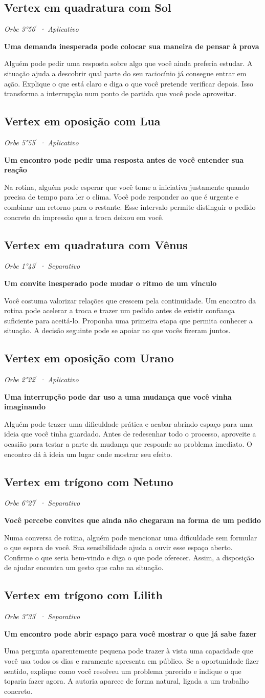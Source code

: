 \documentclass[11pt,a4paper]{article}
\newcommand{\leitura}[3]{\subsection{#1}\textit{#2}\par #3}
\newcommand{\subtituloleitura}[1]{\textbf{#1}\par\nopagebreak[4]}
\begin{document}
\leitura{Vertex em quadratura com Sol}{Orbe 3°56\ensuremath{^{\prime}} · Aplicativo}{
\subtituloleitura{Uma demanda inesperada pode colocar sua maneira de pensar à prova}
Alguém pode pedir uma resposta sobre algo que você ainda preferia estudar. A situação ajuda a descobrir qual parte do seu raciocínio já consegue entrar em ação. Explique o que está claro e diga o que você pretende verificar depois. Isso transforma a interrupção num ponto de partida que você pode aproveitar.
}

\leitura{Vertex em oposição com Lua}{Orbe 5°55\ensuremath{^{\prime}} · Aplicativo}{
\subtituloleitura{Um encontro pode pedir uma resposta antes de você entender sua reação}
Na rotina, alguém pode esperar que você tome a iniciativa justamente quando precisa de tempo para ler o clima. Você pode responder ao que é urgente e combinar um retorno para o restante. Esse intervalo permite distinguir o pedido concreto da impressão que a troca deixou em você.
}

\leitura{Vertex em quadratura com Vênus}{Orbe 1°43\ensuremath{^{\prime}} · Separativo}{
\subtituloleitura{Um convite inesperado pode mudar o ritmo de um vínculo}
Você costuma valorizar relações que crescem pela continuidade. Um encontro da rotina pode acelerar a troca e trazer um pedido antes de existir confiança suficiente para aceitá-lo. Proponha uma primeira etapa que permita conhecer a situação. A decisão seguinte pode se apoiar no que vocês fizeram juntos.
}

\leitura{Vertex em oposição com Urano}{Orbe 2°22\ensuremath{^{\prime}} · Aplicativo}{
\subtituloleitura{Uma interrupção pode dar uso a uma mudança que você vinha imaginando}
Alguém pode trazer uma dificuldade prática e acabar abrindo espaço para uma ideia que você tinha guardado. Antes de redesenhar todo o processo, aproveite a ocasião para testar a parte da mudança que responde ao problema imediato. O encontro dá à ideia um lugar onde mostrar seu efeito.
}

\leitura{Vertex em trígono com Netuno}{Orbe 6°27\ensuremath{^{\prime}} · Separativo}{
\subtituloleitura{Você percebe convites que ainda não chegaram na forma de um pedido}
Numa conversa de rotina, alguém pode mencionar uma dificuldade sem formular o que espera de você. Sua sensibilidade ajuda a ouvir esse espaço aberto. Confirme o que seria bem-vindo e diga o que pode oferecer. Assim, a disposição de ajudar encontra um gesto que cabe na situação.
}

\leitura{Vertex em trígono com Lilith}{Orbe 3°33\ensuremath{^{\prime}} · Separativo}{
\subtituloleitura{Um encontro pode abrir espaço para você mostrar o que já sabe fazer}
Uma pergunta aparentemente pequena pode trazer à vista uma capacidade que você usa todos os dias e raramente apresenta em público. Se a oportunidade fizer sentido, explique como você resolveu um problema parecido e indique o que toparia fazer agora. A autoria aparece de forma natural, ligada a um trabalho concreto.
}
\end{document}
